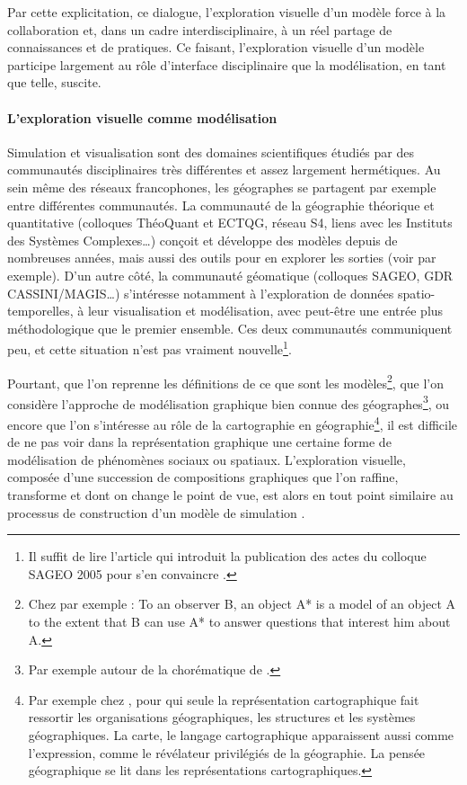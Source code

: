 \noindent Par cette explicitation, ce dialogue, l'exploration visuelle d'un modèle force à la collaboration et, dans un cadre interdisciplinaire, à un réel partage de connaissances et de pratiques.
Ce faisant, l'exploration visuelle d'un modèle participe largement au rôle d'interface disciplinaire que la modélisation, en tant que telle, suscite.


\paragraph{L'exploration visuelle comme modélisation}
Simulation et visualisation sont des domaines scientifiques étudiés par des communautés disciplinaires très différentes et assez largement hermétiques.
Au sein même des réseaux francophones, les géographes se partagent par exemple entre différentes communautés.
La communauté de la géographie théorique et quantitative (colloques ThéoQuant et ECTQG, réseau S4, liens avec les Instituts des Systèmes Complexes\ldots) conçoit et développe des modèles depuis de nombreuses années, mais aussi des outils pour en explorer les sorties (voir \textcite{tannier:halshs-01003259} par exemple).
D'un autre côté, la communauté géomatique (colloques SAGEO, GDR CASSINI/MAGIS\ldots) s'intéresse notamment à l'exploration de données spatio-temporelles, à leur visualisation et modélisation, avec peut-être une entrée plus méthodologique que le premier ensemble.
Ces deux communautés communiquent peu, et cette situation n'est pas vraiment nouvelle\footnote{
	Il suffit de lire l'article qui introduit la publication des actes du colloque SAGEO 2005 pour s'en convaincre \autocite{josselin_presentation_2006}.
}.

\noindent Pourtant, que l'on reprenne les définitions de ce que sont les modèles\footnote{
	Chez \textcite{minsky_matter_1965} par exemple : \og To an observer B, an object A* is a model of an object A to the extent that B can use A* to answer questions that interest him about A.\fg{}
}, que l'on considère l'approche de modélisation graphique bien connue des géographes\footnote{
	Par exemple autour de la chorématique de \textcite{brunet1980composition}.
}, ou encore que l'on s'intéresse au rôle de la cartographie en géographie\footnote{
	Par exemple chez \textcite[246--247]{pinchemel_geographie_1979}, pour qui \og seule la représentation cartographique fait ressortir les organisations géographiques, les structures et les systèmes géographiques.
	La carte, le langage cartographique apparaissent aussi comme l'expression, comme le révélateur privilégiés de la géographie.
	La pensée géographique se lit dans les représentations cartographiques\fg{}.
}, il est difficile de ne pas voir dans la représentation graphique une certaine forme de modélisation de phénomènes sociaux ou spatiaux.
L'exploration visuelle, composée d'une succession de compositions graphiques que l'on raffine, transforme et dont on change le point de vue, est alors en tout point similaire au processus de construction d'un modèle de simulation \autocite{andrienko2018viewing}.

